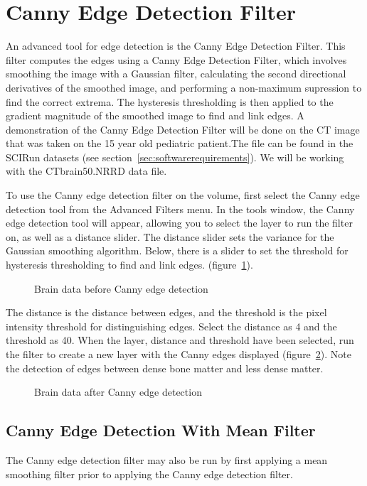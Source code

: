 \documentclass[fleqn,11pt,openany]{book}
\begin{document}
\section{Canny Edge Detection Filter}
An advanced tool for edge detection is the Canny Edge Detection Filter. This filter computes the edges using a Canny Edge Detection Filter, which involves smoothing the image with a Gaussian filter, calculating the second directional derivatives of the smoothed image, and performing a non-maximum supression to find the correct extrema. The hysteresis thresholding is then applied to the gradient magnitude of the smoothed image to find and link edges. A demonstration of the Canny Edge Detection Filter will be done on the CT image that was taken on the 15 year old pediatric patient.The file can be found in the SCIRun datasets (see section~\ref{sec:softwarerequirements}). We will be working with the CTbrain50.NRRD data file.

To use the Canny edge detection filter on the volume, first select the Canny edge detection tool from the Advanced Filters menu. In the tools window, the Canny edge detection tool will appear, allowing you to select the layer to run the filter on, as well as a distance slider. The distance slider sets the variance for the Gaussian smoothing algorithm. Below, there is a slider to set the threshold for hysteresis thresholding to find and link edges. (figure~\ref{fig:CannyBefore}). 

\begin{figure}
\caption{Brain data before Canny edge detection}\label{fig:CannyBefore}
\end{figure}

The distance is the distance between edges, and the threshold is the pixel intensity threshold for distinguishing edges. Select the distance as 4 and the threshold as 40. When the layer, distance and threshold have been selected, run the filter to create a new layer with the Canny edges displayed (figure~\ref{fig:CannyAfter}). Note the detection of edges between dense bone matter and less dense matter.

\begin{figure}
\caption{Brain data after Canny edge detection}\label{fig:CannyAfter}
\end{figure}

\subsection{Canny Edge Detection With Mean Filter}
The Canny edge detection filter may also be run by first applying a mean smoothing filter prior to applying the Canny edge detection filter. 
\end{document}

